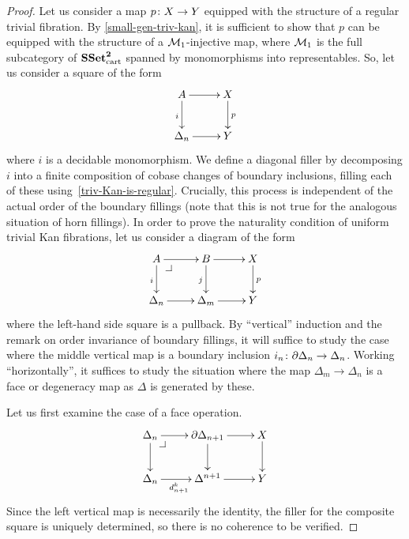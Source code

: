 \documentclass[reqno,10pt,a4paper,oneside]{amsart}
\begin{document}
\begin{proof} Let us consider a map $p \co X \to Y$ equipped with the structure of a 
regular trivial fibration. By \cref{small-gen-triv-kan}, it is sufficient to show that $p$
can be equipped with the structure of a $\cal{M}_1$-injective map, where $\cal{M}_1$
is the full subcategory of $\SSet^{\mathbf{2}}_\cart$  spanned by monomorphisms into representables.
So, let us consider a square of the form
\[
\xymatrix{
A \ar[d]_i \ar[r] & X \ar[d]^p \\
\Delta_n \ar[r]  & Y }
\]
where $i$ is a decidable monomorphism. 
We define a diagonal filler by decomposing $i$ into a finite composition of cobase changes of boundary inclusions, filling each of these using~\cref{triv-Kan-is-regular}.
Crucially, this process is independent of the actual order of the boundary fillings (note that this is not true for the analogous situation of horn fillings). In order to prove the naturality condition of uniform trivial Kan fibrations, 
let us consider a diagram of the form
\[
\xymatrix{
  A
  \ar[r]
  \ar[d]_i
  \pullback{dr}
&
  B
  \ar[d]_j 
  \ar[r]
&
  X
  \ar[d]^p 
\\
  \Delta_{n}
  \ar[r]
&
  \Delta_{m}
  \ar[r]
&
  Y
}
\]
where the left-hand side square is a pullback. 
By ``vertical'' induction and the remark on order invariance of boundary fillings, it will suffice to study the case where the middle vertical map is a boundary inclusion $i_n \co \partial \Delta_n \to \Delta_n$.
Working ``horizontally'', it suffices to study the situation where the map $\Delta_{m} \to \Delta_n$ is a face or degeneracy map as $\Delta$ is generated by these.

Let us first examine the case of a face operation.
\[
\xymatrix{
  \Delta_n
  \ar[r]
  \ar[d]
  \pullback{dr}
&
  \partial \Delta_{n+1}
  \ar[d]
  \ar[r]
&
  X
  \ar[d]
\\
  \Delta_n
  \ar[r]_{d^k_{n+1}}
&
  \Delta^{n+1}
  \ar[r]
&
  Y
}
\]
Since the left vertical map is necessarily the identity, the filler for the composite square is uniquely determined, so there is no coherence to be verified.


\end{proof}
\end{document}
